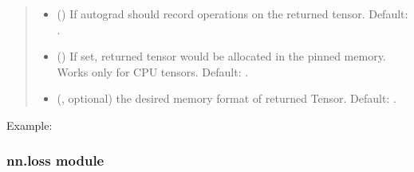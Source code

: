 \documentclass[letterpaper,10pt,english,openany,oneside]{sphinxmanual}
\begin{document}
\begin{fulllineitems}
\begin{quote}
\begin{description}
\begin{itemize}
\item {} 
 (\sphinxstyleliteralemphasis{\sphinxupquote{, }}) \textendash{} If autograd should record operations on the
returned tensor. Default: .

\item {} 
 (\sphinxstyleliteralemphasis{\sphinxupquote{, }}) \textendash{} If set, returned tensor would be allocated in
the pinned memory. Works only for CPU tensors. Default: .

\item {} 
 (, optional) \textendash{} the desired memory format of
returned Tensor. Default: .

\end{itemize}

\end{description}\end{quote}

Example:

\begin{sphinxVerbatim}[commandchars=\\\{\}]
 
\PYG{g+go}{       [[ 6.3984,  0.0000,  0.0000],}
\PYG{g+go}{        [ 0.0000,  0.0000,  0.0000]])}
\end{sphinxVerbatim}

\end{fulllineitems}



\subsubsection{nn.loss module}
\label{\detokenize{nn:module-nn.loss}}\label{\detokenize{nn:nn-loss-module}}
\end{document}
